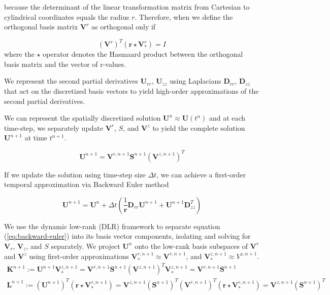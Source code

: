 \documentclass{article}
\begin{document}
because the determinant of the linear transformation matrix from Cartesian to cylindrical coordinates equals the radius $r$. Therefore, when we define the orthogonal basis matrix $\mathbf{V}^r$ as orthogonal only if

\begin{equation}
    (\mathbf{V}^r)^T \left(\mathbf{r}  \star \mathbf{V}_*^{r} \right) = I
\end{equation}
where the $\star$ operator denotes the Hasmaard product between the orthogonal basis matrix and the vector of r-values. 

We represent the second partial derivatives $\mathbf{U}_{rr}$, $\mathbf{U}_{zz}$ using Laplacians $\mathbf{D}_{rr}$, $\mathbf{D}_{zz}$ that act on the discretized basis vectors to yield high-order approximations of the second partial derivatives. 

We can represent the spatially discretized solution $\mathbf{U}^n \approx \mathbf{U}(t^n)$ and at each time-step, we separately update $\mathbf{V}^r$, $S$, and $\mathbf{V}^z$ to yield the complete solution $\mathbf{U}^{n+1}$ at time $t^{n+1}$.

\begin{equation}
    \mathbf{U}^{n+1} = \mathbf{V}^{r, n+1} \mathbf{S}^{n+1} (\mathbf{V}^{z, n+1})^T
\end{equation}

If we update the solution using time-step size $\Delta t$, we can achieve a first-order temporal approximation via Backward Euler method 

\begin{equation}
    \mathbf{U}^{n+1} = \mathbf{U}^n + \Delta t\left(\frac{1}{\mathbf{r}} \mathbf{D}_{rr}\mathbf{U}^{n+1} + \mathbf{U}^{n+1}\mathbf{D}_{zz}^T\right)
    \label{eq:backward-euler}
\end{equation}

We use the dynamic low-rank (DLR) framework to separate equation (\ref{eq:backward-euler}) into its basis vector components, isolating and solving for $\mathbf{V}_r$, $\mathbf{V}_z$, and $S$ separately. We project $\mathbf{U}^n$ onto the low-rank basis subspaces of $\mathbf{V}^r$ and $\mathbf{V}^z$ using first-order approximations $\mathbf{V}_*^{r, n+1} \approx  \mathbf{V}^{r, n+1}$, and $\mathbf{V}_*^{z, n+1} \approx V^{z, n+1}$. 
\begin{equation}
\begin{split}
    \mathbf{K}^{n+1} := \mathbf{U}^{n+1} \mathbf{V}_*^{z, n+1} = \mathbf{V}^{r, n+1} \mathbf{S}^{n+1} (\mathbf{V}^{z, n+1})^T \mathbf{V}_*^{z, n+1} = \mathbf{V}^{r, n+1} \mathbf{S}^{n+1}\\
    \mathbf{L}^{n+1} := (\mathbf{U}^{n+1})^T \left(\mathbf{r}  \star \mathbf{V}_*^{r, n+1} \right) = \mathbf{V}^{z, n+1} (\mathbf{S}^{n+1})^T (\mathbf{V}^{r, n+1})^T \left(\mathbf{r}  \star \mathbf{V}_*^{r, n+1} \right) = \mathbf{V}^{z, n+1} (\mathbf{S}^{n+1})^T
\end{split}
\end{equation}
\end{document}
